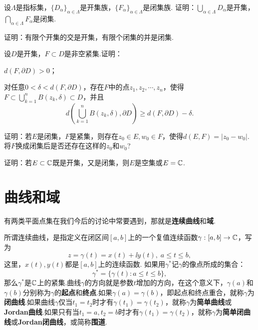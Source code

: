 \begin{xiti}
  \item 设$\varLambda$是指标集，$\{D_\alpha\}_{\alpha\in\varLambda}$是开集族，$\{F_\alpha\}_{\alpha\in\varLambda}$是闭集族. 证明：$\bigcup_{\alpha\in\varLambda}D_\alpha$是开集，$\bigcap _{\alpha\in\varLambda}F_\alpha$是闭集.
  \item 证明：有限个开集的交是开集，有限个闭集的并是闭集.
  \item 设$D$是开集，$F\subset D$是非空紧集.证明：
    \begin{enuma}
      \item $d(F,\partial D)>0$；
      \item 对任意$0<\delta<d(F,\partial D)$，存在$F$中的点$z_1,z_2,\cdots,z_n$，使得$F\subset\bigcup_{k=1}^nB(z_k,\delta)\subset D$，并且
          \[
           d\left(\bigcup_{k=1}^nB(z_k,\delta),\partial D\right) \ge d(F,\partial D)-\delta.
          \]
    \end{enuma}
  \item 证明：若$E$是闭集，$F$是紧集，则存在$z_0\in E,w_0\in F$，使得$d(E,F)=|z_0-w_0|$.将$F$换成闭集后是否还存在这样的$z_0$和$w_0$?
  \item 证明：若$E\subset \mathbb C$既是开集，又是闭集，则$E$是空集或$E=\mathbb C$.
\end{xiti}

\section{曲线和域\label{sec1.6}}
有两类平面点集在我们今后的讨论中常要遇到，那就是\textbf{连续曲线}和\textbf{域}.

所谓连续曲线，是指定义在闭区间$[a,b]$上的一个复值连续函数$\gamma:[a,b]\to\mathbb C$，写为
\[
  z = \gamma(t) = x(t) + \ii y(t),\;a\le t\le b,
\]
这里，$x(t),y(t)$都是$[a,b]$上的连续函数. 如果用$\gamma^\ast$记$\gamma$的像点所成的集合：
\[
  \gamma^\ast = \{\gamma(t):a\le t\le b\},
\]
那么$\gamma^\ast$是$\mathbb C$上的紧集.曲线$\gamma$的方向就是参数$t$增加的方向，在这个意义下，$\gamma(a)$和$\gamma(b)$分别称为$\gamma$的\textbf{起点}和\textbf{终点}.如果$\gamma(a)=\gamma(b)$，即起点和终点重合，就称$\gamma$为\textbf{闭曲线}.如果曲线$\gamma$仅当$t_1=t_2$时才有$\gamma(t_1)=\gamma(t_2)$，就称$\gamma$为\textbf{简单曲线}或\textbf{Jordan曲线}.如果只有当$t_1=a,t_2=b$时才有$\gamma(t_1)=\gamma(t_2)$，就称$\gamma$为\textbf{简单闭曲线}或\textbf{Jordan闭曲线}，或简称\textbf{围道}.


